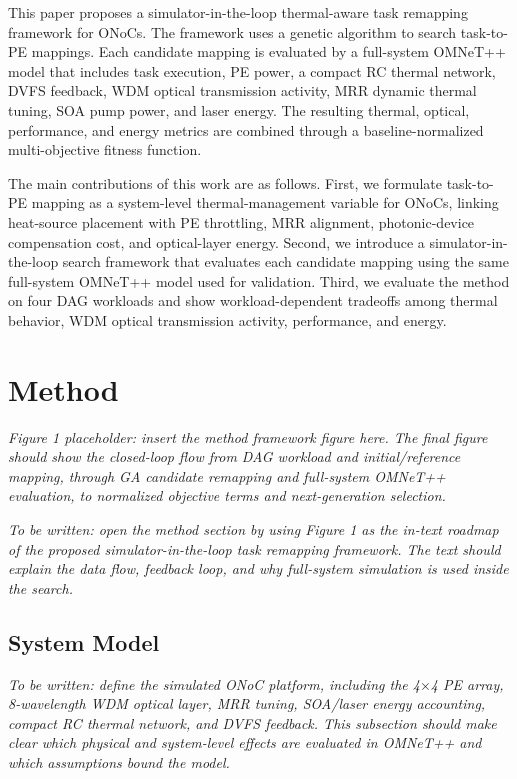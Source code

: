 \documentclass[conference]{IEEEtran}
\begin{document}
This paper proposes a simulator-in-the-loop thermal-aware task remapping framework for ONoCs. The framework uses a genetic algorithm to search task-to-PE mappings. Each candidate mapping is evaluated by a full-system OMNeT++ model that includes task execution, PE power, a compact RC thermal network, DVFS feedback, WDM optical transmission activity, MRR dynamic thermal tuning, SOA pump power, and laser energy. The resulting thermal, optical, performance, and energy metrics are combined through a baseline-normalized multi-objective fitness function.

The main contributions of this work are as follows. First, we formulate task-to-PE mapping as a system-level thermal-management variable for ONoCs, linking heat-source placement with PE throttling, MRR alignment, photonic-device compensation cost, and optical-layer energy. Second, we introduce a simulator-in-the-loop search framework that evaluates each candidate mapping using the same full-system OMNeT++ model used for validation. Third, we evaluate the method on four DAG workloads and show workload-dependent tradeoffs among thermal behavior, WDM optical transmission activity, performance, and energy.

\section{Method}

\noindent\textit{Figure 1 placeholder: insert the method framework figure here. The final figure should show the closed-loop flow from DAG workload and initial/reference mapping, through GA candidate remapping and full-system OMNeT++ evaluation, to normalized objective terms and next-generation selection.}

\noindent\textit{To be written: open the method section by using Figure 1 as the in-text roadmap of the proposed simulator-in-the-loop task remapping framework. The text should explain the data flow, feedback loop, and why full-system simulation is used inside the search.}

\subsection{System Model}

\noindent\textit{To be written: define the simulated ONoC platform, including the 4$\times$4 PE array, 8-wavelength WDM optical layer, MRR tuning, SOA/laser energy accounting, compact RC thermal network, and DVFS feedback. This subsection should make clear which physical and system-level effects are evaluated in OMNeT++ and which assumptions bound the model.}
\end{document}
